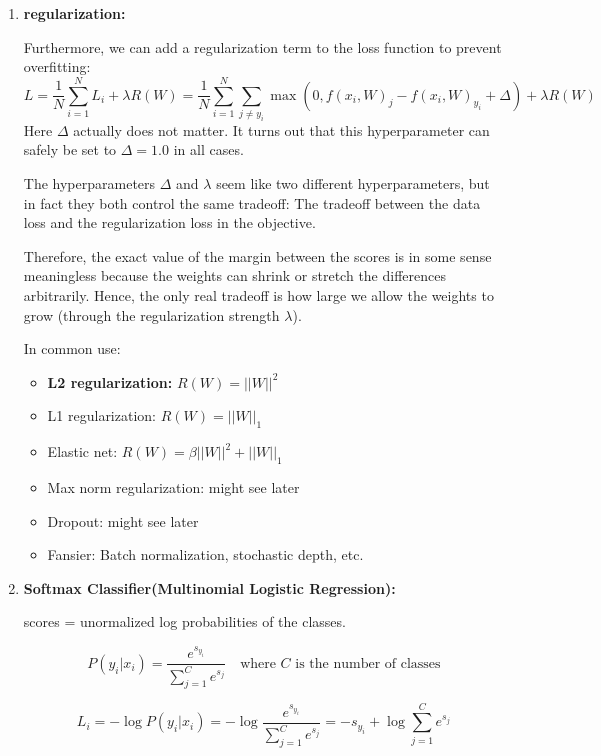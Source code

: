 \documentclass{article}
\numberwithin{equation}{section}
\begin{document}
\begin{CJK}{UTF8}{gbsn}
\begin{enumerate}
    \item \textbf{regularization:}\par
    Furthermore, we can add a regularization term to the loss function to prevent overfitting:
    \begin{equation}
        L = \frac{1}{N} \sum_{i=1}^{N} L_i + \lambda R(W) = \frac{1}{N} \sum_{i=1}^{N} \sum_{j \neq y_i} \max(0, f(x_i, W)_j - f(x_i, W)_{y_i} + \Delta) + \lambda R(W)
    \end{equation}
    Here \(\Delta\) actually does not matter. It turns out that this hyperparameter can safely be set to \(\Delta=1.0\) in all cases.\par
    The hyperparameters \(\Delta\) and \(\lambda\) seem like two different hyperparameters, but in fact they both control the same tradeoff: The tradeoff between the data loss and the regularization loss in the objective.\par
    Therefore, the exact value of the margin between the scores is in some sense meaningless because the weights can shrink or stretch the differences arbitrarily. Hence, the only real tradeoff is how large we allow the weights to grow (through the regularization strength \(\lambda\)).\par
    In common use:
    \begin{itemize}    
        \item \textbf{L2 regularization:} \(R(W) = ||W||^2\)
        \item L1 regularization: \(R(W) = ||W||_1\)
        \item Elastic net: \(R(W) = \beta ||W||^2 + ||W||_1\)
        \item Max norm regularization: might see later
        \item Dropout: might see later
        \item Fansier: Batch normalization, stochastic depth, etc.
    \end{itemize}

    \item \textbf{Softmax Classifier(Multinomial Logistic Regression):}\par
    scores = unormalized log probabilities of the classes.\par
    \begin{equation}
        P(y_i | x_i) = \frac{e^{s_{y_i}}}{\sum_{j=1}^{C} e^{s_j}} \quad \text{where } C \text{ is the number of classes}
    \end{equation}

    \begin{equation}
        L_i = -\log P(y_i | x_i) = -\log \frac{e^{s_{y_i}}}{\sum_{j=1}^{C} e^{s_j}} = -s_{y_i} + \log \sum_{j=1}^{C} e^{s_j}
    \end{equation}


\end{enumerate}
\end{CJK}
\end{document}
